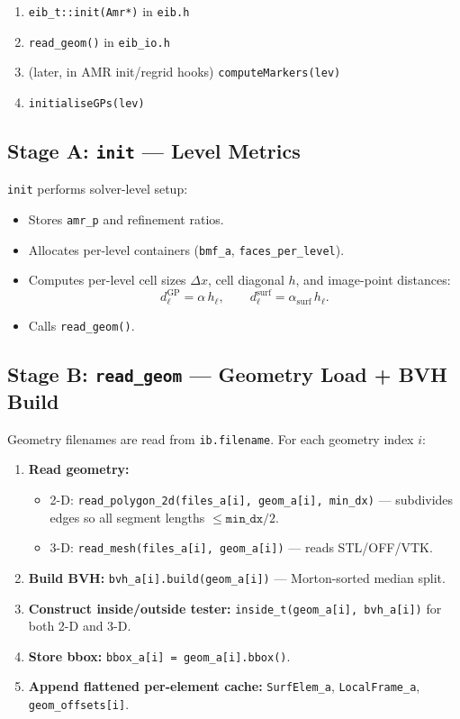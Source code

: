 \documentclass[11pt,a4paper]{article}
\begin{document}
\begin{enumerate}[nosep]
  \item \texttt{eib\_t::init(Amr*)} in \texttt{eib.h}
  \item \texttt{read\_geom()} in \texttt{eib\_io.h}
  \item (later, in AMR init/regrid hooks) \texttt{computeMarkers(lev)}
  \item \texttt{initialiseGPs(lev)}
\end{enumerate}

\subsection{Stage A: \texttt{init} --- Level Metrics}

\texttt{init} performs solver-level setup:
\begin{itemize}[nosep]
  \item Stores \texttt{amr\_p} and refinement ratios.
  \item Allocates per-level containers (\texttt{bmf\_a}, \texttt{faces\_per\_level}).
  \item Computes per-level cell sizes $\Delta x$, cell diagonal $h$, and image-point distances:
  \[
    d^{\mathrm{GP}}_\ell = \alpha\,h_\ell, \qquad
    d^{\mathrm{surf}}_\ell = \alpha_{\mathrm{surf}}\,h_\ell.
  \]
  \item Calls \texttt{read\_geom()}.
\end{itemize}

\subsection{Stage B: \texttt{read\_geom} --- Geometry Load + BVH Build}

Geometry filenames are read from \texttt{ib.filename}.
For each geometry index $i$:

\begin{enumerate}[nosep]
  \item \textbf{Read geometry:}
  \begin{itemize}[nosep]
    \item 2-D: \texttt{read\_polygon\_2d(files\_a[i], geom\_a[i], min\_dx)} ---
          subdivides edges so all segment lengths $\leq \texttt{min\_dx}/2$.
    \item 3-D: \texttt{read\_mesh(files\_a[i], geom\_a[i])} --- reads STL/OFF/VTK.
  \end{itemize}
  \item \textbf{Build BVH:} \texttt{bvh\_a[i].build(geom\_a[i])} --- Morton-sorted median split.
  \item \textbf{Construct inside/outside tester:}
        \texttt{inside\_t(geom\_a[i], bvh\_a[i])} for both 2-D and 3-D.
  \item \textbf{Store bbox:} \texttt{bbox\_a[i] = geom\_a[i].bbox()}.
  \item \textbf{Append flattened per-element cache:}
        \texttt{SurfElem\_a}, \texttt{LocalFrame\_a}, \texttt{geom\_offsets[i]}.
\end{enumerate}
\end{document}
